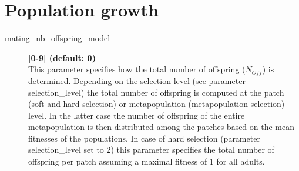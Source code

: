 \documentclass[letterpaper,12pt,oneside]{book}
\begin{document}
\section{Population growth}
\begin{description}
\item[mating\_nb\_offspring\_model] \textbf{[0-9] (default: 0)}\\
This parameter specifies how the total number of offspring ($N_{Off}$) is determined. Depending on the selection level (see parameter \textsf{selection\_level}) the total number of offspring is computed at the patch (soft and hard selection) or metapopulation (metapopulation selection) level. In the latter case the number of offspring of the entire metapopulation is then distributed among the patches based on the mean fitnesses of the populations. In case of hard selection (parameter \textsf{selection\_level} set to 2) this parameter specifies the total number of offspring per patch assuming a maximal fitness of 1 for all adults.


\end{description}
\end{document}
